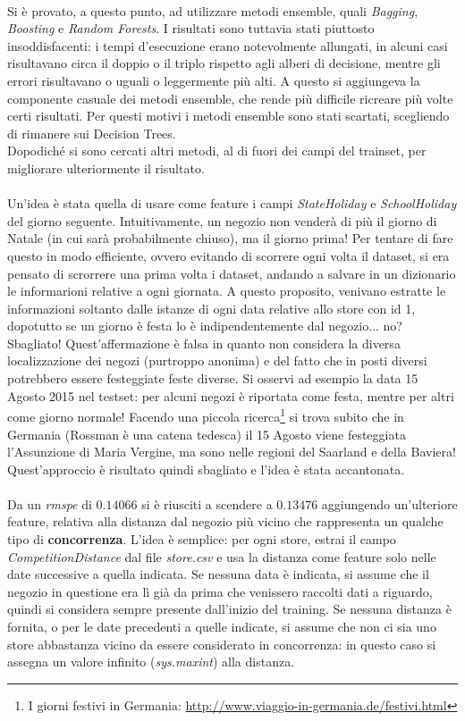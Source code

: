 \\
Si è provato, a questo punto, ad utilizzare metodi ensemble, quali \textit{Bagging}, \textit{Boosting} e \textit{Random Forests}. I risultati sono tuttavia stati piuttosto insoddisfacenti: i tempi d'esecuzione erano notevolmente allungati,  in alcuni casi risultavano circa il doppio o il triplo rispetto agli alberi di decisione, mentre gli errori risultavano o uguali o leggermente più alti. A questo si aggiungeva la componente casuale dei metodi ensemble, che rende più difficile ricreare più volte certi risultati. Per questi motivi i metodi ensemble sono stati scartati, scegliendo di rimanere sui Decision Trees.\\
Dopodiché si sono cercati altri metodi, al di fuori dei campi del trainset, per migliorare ulteriormente il risultato.\\
\\
Un'idea è stata quella di usare come feature i campi \textit{StateHoliday} e \textit{SchoolHoliday} del giorno seguente. Intuitivamente, un negozio non venderà di più il giorno di Natale (in cui sarà probabilmente chiuso), ma il giorno prima! Per tentare di fare questo in modo efficiente, ovvero evitando di scorrere ogni volta il dataset, si era pensato di scrorrere una prima volta i dataset, andando a salvare in un dizionario le informarioni relative a ogni giornata. A questo proposito, venivano estratte le informazioni soltanto dalle istanze di ogni data relative allo store con id 1, dopotutto se un giorno è festa lo è indipendentemente dal negozio... no? Sbagliato! Quest'affermazione è falsa in quanto non considera la diversa localizzazione dei negozi (purtroppo anonima) e del fatto che in posti diversi potrebbero essere festeggiate feste diverse. Si osservi ad esempio la data 15 Agosto 2015 nel testset: per alcuni negozi è riportata come festa, mentre per altri come giorno normale! Facendo una piccola ricerca\footnote{I giorni festivi in Germania: \url{http://www.viaggio-in-germania.de/festivi.html}} si trova subito che in Germania (Rossman è una catena tedesca) il 15 Agosto viene festeggiata l'Assunzione di Maria Vergine, ma sono nelle regioni del Saarland e della Baviera! Quest'approccio è risultato quindi sbagliato e l'idea è stata accantonata.\\
\\
Da un \textit{rmspe} di $0.14066$ si è riusciti a scendere a $0.13476$ aggiungendo un'ulteriore feature, relativa alla distanza dal negozio più vicino che rappresenta un qualche tipo di \textbf{concorrenza}. L'idea è semplice: per ogni store, estrai il campo \textit{CompetitionDistance} dal file \textit{store.csv} e usa la  distanza come feature solo nelle date successive a quella indicata. Se nessuna data è indicata, si assume che il negozio in questione era lì già da prima che venissero raccolti dati a riguardo, quindi si considera sempre presente dall'inizio del training. Se nessuna distanza è fornita, o per le date precedenti a quelle indicate, si assume che non ci sia uno store abbastanza vicino da essere considerato in concorrenza: in questo caso si assegna un valore infinito (\textit{sys.maxint}) alla distanza.\\
